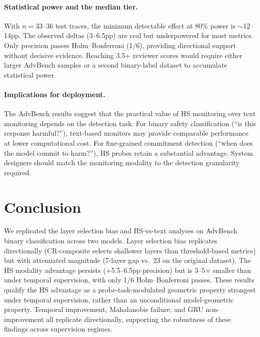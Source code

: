 \documentclass[11pt]{article}
\begin{document}
\paragraph{Statistical power and the median tier.}
With $n{=}33$--36 test traces, the minimum detectable effect at 80\% power is $\sim$12--14pp. The observed deltas (3--6.5pp) are real but underpowered for most metrics. Only precision passes Holm--Bonferroni (1/6), providing directional support without decisive evidence. Reaching 3.5+ reviewer scores would require either larger AdvBench samples or a second binary-label dataset to accumulate statistical power.

\paragraph{Implications for deployment.}
The AdvBench results suggest that the practical value of HS monitoring over text monitoring depends on the detection task. For binary safety classification (``is this response harmful?''), text-based monitors may provide comparable performance at lower computational cost. For fine-grained commitment detection (``when does the model commit to harm?''), HS probes retain a substantial advantage. System designers should match the monitoring modality to the detection granularity required.

\section{Conclusion}
\label{sec:conclusion}

We replicated the layer selection bias and HS-vs-text analyses on AdvBench binary classification across two models. Layer selection bias replicates directionally (CR-composite selects shallower layers than threshold-based metrics) but with attenuated magnitude (7-layer gap vs.\ 23 on the original dataset). The HS modality advantage persists (+5.5--6.5pp precision) but is 3--5$\times$ smaller than under temporal supervision, with only 1/6 Holm--Bonferroni passes. These results qualify the HS advantage as a probe-task-modulated geometric property strongest under temporal supervision, rather than an unconditional model-geometric property. Temporal improvement, Mahalanobis failure, and GRU non-improvement all replicate directionally, supporting the robustness of these findings across supervision regimes.
\end{document}
